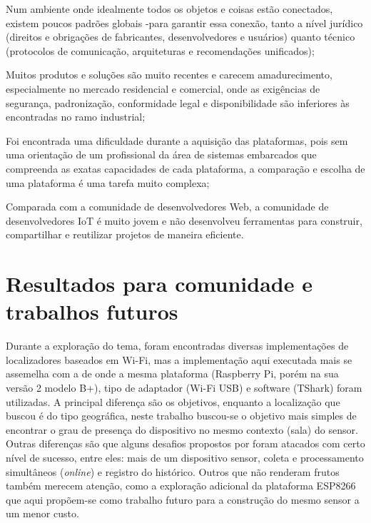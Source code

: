 \begin{alineas}
	\item Num ambiente onde
	idealmente todos os objetos e coisas estão conectados, existem poucos padrões globais
	-para garantir essa conexão, tanto a nível jurídico (direitos e
	obrigações de fabricantes, desenvolvedores e usuários) quanto técnico
	(protocolos de comunicação, arquiteturas e recomendações unificados);

	\item Muitos produtos e soluções são muito recentes e carecem amadurecimento,
	especialmente no mercado residencial e comercial, onde as exigências de
	segurança, padronização, conformidade legal e disponibilidade são inferiores
	às encontradas no ramo industrial;

	\item Foi encontrada uma dificuldade durante a aquisição das plataformas, pois
	sem uma orientação de um profissional da área de sistemas embarcados que compreenda as exatas capacidades de cada plataforma, a
	comparação e escolha de uma plataforma é uma tarefa muito complexa;

	\item Comparada com a comunidade de desenvolvedores Web, a comunidade
	de desenvolvedores IoT é muito jovem e não desenvolveu ferramentas para
	construir, compartilhar e reutilizar projetos de maneira eficiente.
\end{alineas}


\section{Resultados para comunidade e trabalhos futuros}
\label{sec:trab-futuros}

Durante a exploração do tema, foram encontradas diversas implementações de
localizadores baseados em Wi-Fi, mas a implementação aqui executada mais se
assemelha com a de  onde a mesma plataforma
(Raspberry Pi, porém na sua versão 2 modelo B+), tipo de adaptador (Wi-Fi USB)
e software (TShark) foram utilizadas. A principal diferença são os
objetivos, enquanto a localização que  buscou é do tipo
geográfica, neste trabalho buscou-se o objetivo mais simples de encontrar o grau
de presença do dispositivo no mesmo contexto (sala) do sensor. Outras diferenças
são que alguns desafios propostos por  foram atacados
com certo nível de sucesso, entre eles: mais de um dispositivo sensor,
coleta e processamento simultâneos (\emph{online}) e registro do histórico.
Outros que não renderam frutos também merecem atenção, como a exploração
adicional da plataforma ESP8266 que aqui propõem-se como trabalho futuro para a
construção do mesmo sensor a um menor custo.
